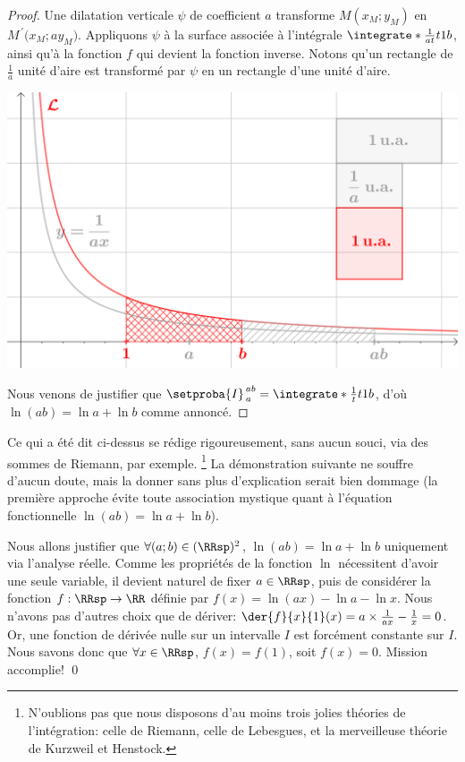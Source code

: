 \begin{proof}
	Une dilatation verticale $\psi$ de coefficient $a$ transforme $M(x_M ; y_M)$ en $M^{\,\prime}\big( x_M ; a y_M)$. 
	Appliquons $\psi$ à la surface associée à l'intégrale $\integrate*{\frac{1}{at}}{t}{1}{b}$, ainsi qu'à la fonction $f$ qui devient la fonction inverse. Notons qu'un rectangle de $\frac1a$ unité d'aire est transformé par $\psi$ en un rectangle d'une unité d'aire.

	\begin{center}
		\includegraphics[scale=.5]{content/ln/func-eq-3.png}
	\end{center}
	
	Nous venons de justifier que $\setproba{I}_{\,a}^{\,ab} = \integrate*{\frac{1}{t}}{t}{1}{b}$,
	d'où $\ln(a b) = \ln a + \ln b$ comme annoncé.
\end{proof}


\begin{remark}
	Ce qui a été dit ci-dessus se rédige rigoureusement, sans aucun souci, via des sommes de Riemann, par exemple.%
	\footnote{
		N'oublions pas que nous disposons d'au moins trois jolies théories de l'intégration:
    	celle de Riemann,
    	celle de Lebesgues,
    	et
    	la merveilleuse théorie de Kurzweil et Henstock.
	}
	La démonstration suivante ne souffre d'aucun doute, mais la donner sans plus d'explication serait bien dommage (la première approche évite toute association mystique quant à l'équation fonctionnelle $\ln(a b) = \ln a + \ln b$). 
\end{remark}


{
\emph{\altproof{}}
	Nous allons justifier que 
	$\forall (a;b) \in ( \RRsp )^2$,
	$\ln(a b) = \ln a + \ln b$
	uniquement via l'analyse réelle.
	Comme les propriétés de la fonction $\ln$ nécessitent d'avoir une seule variable,
	il devient naturel de fixer $a \in \RRsp$, puis de considérer la fonction
	$f: \RRsp \to \RR$
	définie par
	$f(x) = \ln(a x) - \ln a - \ln x$.
	Nous n'avons pas d'autres choix que de dériver:
	$\der{f}{x}{1}(x) = a \times \frac{1}{a x} - \frac1x = 0$.
	Or,
	une fonction de dérivée nulle sur un intervalle $I$ est forcément constante sur $I$. Nous savons donc que
	$\forall x \in \RRsp$,
	$f(x) = f(1)$,
	soit
	$f(x) = 0$.
	Mission accomplie!
\qed
}

